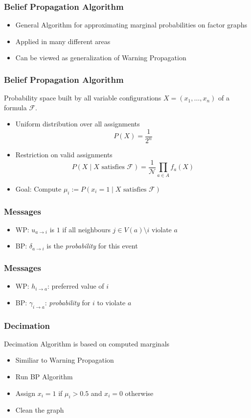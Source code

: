 \begin{frame}
	\frametitle{Belief Propagation Algorithm}
	\begin{itemize}
		\item General Algorithm for approximating marginal probabilities on factor graphs
		\item Applied in many different areas
		\item Can be viewed as generalization of Warning Propagation
	\end{itemize}
\end{frame}

\begin{frame}
	\frametitle{Belief Propagation Algorithm}
	Probability space built by all variable configurations $X = (x_1, \ldots, x_n)$ of a formula $\mathcal{F}$.
	\begin{itemize}
		\item Uniform distribution over all assignments 
		$$P(X) = \frac{1}{2^n}$$
		\item Restriction on valid assignments
	$$P(X \; | \; X \text{ satisfies } \mathcal{F}) = \frac{1}{\mathcal{N}} \prod_{a \in A} f_a(X)$$
	\item Goal: Compute $\mu_i := P(x_i = 1 \; | \; X \text{ satisfies } \mathcal{F})$
	\end{itemize}
\end{frame}

\begin{frame}
	\frametitle{Messages}
	
	\begin{itemize}
		\item WP: $u_{a \rightarrow i}$ is $1$ if all neighbours $j \in V(a) \setminus i$ violate $a$
		\item BP: $\delta_{a \rightarrow i}$ is the \emph{probability} for this event
	\end{itemize}
	
	
\end{frame}

\begin{frame}
	\frametitle{Messages}
	
	\begin{itemize}
		\item WP: $h_{i \rightarrow a}$: preferred value of $i$
		\item BP: $\gamma_{i \rightarrow a}$: \emph{probability} for $i$ to violate $a$
	\end{itemize}
\end{frame}

\begin{frame}
	\frametitle{Decimation}
	Decimation Algorithm is based on computed marginals
	\begin{itemize}
		\item Similiar to Warning Propagation
		\item Run BP Algorithm
		\item Assign $x_i = 1$ if $\mu_i > 0.5$ and $x_i = 0$ otherwise
		\item Clean the graph
	\end{itemize}
\end{frame}



